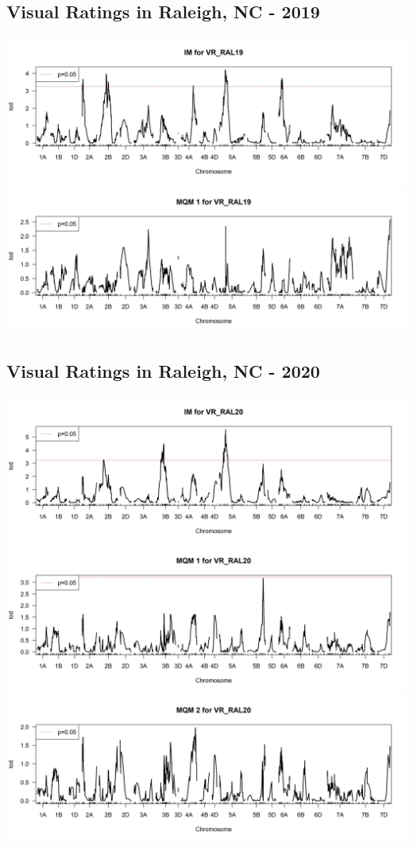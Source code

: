 \documentclass[
]{article}
\begin{document}
\subsection{Visual Ratings in Raleigh, NC -
2019}\label{visual-ratings-in-raleigh-nc---2019}

\includegraphics{Scan_IM_VR_RAL19.jpg}
\includegraphics{Scan_MQM1_VR_RAL19.jpg} \pagebreak

\subsection{Visual Ratings in Raleigh, NC -
2020}\label{visual-ratings-in-raleigh-nc---2020}

\includegraphics{Scan_IM_VR_RAL20.jpg}
\includegraphics{Scan_MQM1_VR_RAL20.jpg}
\includegraphics{Scan_MQM2_VR_RAL20.jpg} \pagebreak
\end{document}
